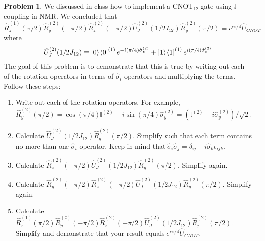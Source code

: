 \documentclass[10pt]{article}
\theoremstyle{definition}
\newtheorem{problem}{Problem}
\begin{document}
\begin{problem}
We discussed in class how to implement a $\text{CNOT}_{12}$ gate using J coupling in NMR. We
concluded that
$$\hat{R}_z^{(1)}(\pi/2)\hat{R}_y^{(2)}(-\pi/2)\hat{R}_z^{(2)}(-\pi/2)\hat{U}_J^{(2)}(1/2J_{12})\hat{R}_y^{(2)}(\pi/2)=e^{i\pi/4}\hat{U}_{CNOT}$$
where
$$\hat{U}_J^{(2)}(1/2J_{12})\equiv \ket{0}\bra{0}^{(1)}e^{-i(\pi/4)\hat{\sigma}_z^{(2)}}+\ket{1}\bra{1}^{(1)}e^{i(\pi/4)\hat{\sigma}_z^{(2)}}$$
The goal of this problem is to demonstrate that this is true by writing out each of the rotation
operators in terms of $\hat{\sigma}_i$ operators and multiplying the terms. Follow these steps:
\begin{enumerate}[label=(\alph*)]
  \item Write out each of the rotation operators.
        For example, $\hat{R}_y^{(2)}(\pi/2)=\cos(\pi/4)\mathbb{I}^{(2)}-i\sin(\pi/4)\hat{\sigma}^{(2)}_y=(\mathbb{I}^{(2)}-i\hat{\sigma}_y^{(2)})/\sqrt{2}$.
  \item Calculate $\hat{U}_J^{(2)}(1/2J_{12})\hat{R}_y^{(2)}(\pi/2)$. Simplify such that each term contains no more than
        one $\hat{\sigma}_i$ operator. Keep in mind that $\hat{\sigma}_i\hat{\sigma}_j = \delta_{ij} + i\hat{\sigma}_k \epsilon _{ijk}$.
  \item Calculate $\hat{R}_z^{(2)}(-\pi/2)\hat{U}_J^{(2)}(1/2J_{12})\hat{R}_y^{(2)}(\pi/2)$. Simplify again.
  \item Calculate $\hat{R}_y^{(2)}(-\pi/2)\hat{R}_z^{(2)}(-\pi/2)\hat{U}_J^{(2)}(1/2J_{12})\hat{R}_y^{(2)}(\pi/2)$. Simplify again.
  \item Calculate $\hat{R}_z^{(1)}(\pi/2)\hat{R}_y^{(2)}(-\pi/2)\hat{R}_z^{(2)}(-\pi/2)\hat{U}_J^{(2)}(1/2J_{12})\hat{R}_y^{(2)}(\pi/2)$. Simplify and
        demonstrate that your result equals $e^{i\pi/4}\hat{U}_{CNOT}$.
\end{enumerate}
\end{problem}
\end{document}
